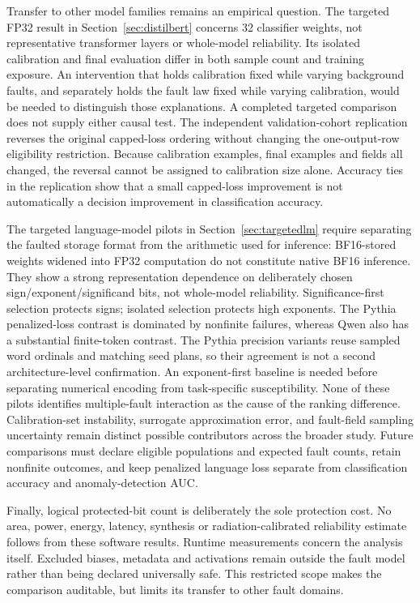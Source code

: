 Transfer to other model families remains an empirical question. The targeted
FP32 result in Section~\ref{sec:distilbert} concerns 32 classifier weights,
not representative transformer layers or whole-model reliability. Its isolated
calibration and final evaluation differ in both sample count and training
exposure. An intervention that holds calibration fixed while varying background
faults, and separately holds the fault law fixed while varying calibration,
would be needed to distinguish those explanations. A completed targeted
comparison does not supply either causal test. The independent validation-cohort
replication reverses the original capped-loss ordering without changing the
one-output-row eligibility restriction. Because calibration examples, final
examples and fields all changed, the reversal cannot be assigned to calibration
size alone. Accuracy ties in the replication show that a small capped-loss
improvement is not automatically a decision improvement in classification accuracy.

The targeted language-model pilots in Section~\ref{sec:targetedlm} require separating
the faulted storage format from the arithmetic used for inference: BF16-stored
weights widened into FP32 computation do not constitute native BF16 inference.
They show a strong representation dependence on deliberately chosen
sign/exponent/significand bits, not whole-model reliability. Significance-first
selection protects signs; isolated selection protects high exponents. The Pythia
penalized-loss contrast is dominated by nonfinite failures, whereas Qwen also
has a substantial finite-token contrast. The Pythia precision variants reuse
sampled word ordinals and matching seed plans, so their agreement is not a
second architecture-level confirmation. An exponent-first baseline is needed
before separating numerical encoding from task-specific susceptibility. None of
these pilots identifies multiple-fault interaction as the cause of the ranking
difference. Calibration-set instability, surrogate approximation error, and
fault-field sampling uncertainty remain distinct possible contributors across
the broader study. Future comparisons must declare eligible populations and
expected fault counts, retain nonfinite outcomes, and keep penalized language
loss separate from classification accuracy and anomaly-detection AUC.

Finally, logical protected-bit count is deliberately the sole protection cost.
No area, power, energy, latency, synthesis or radiation-calibrated reliability
estimate follows from these software results. Runtime measurements concern the
analysis itself. Excluded biases, metadata and activations remain outside the
fault model rather than being declared universally safe. This restricted scope
makes the comparison auditable, but limits its transfer to other fault domains.
